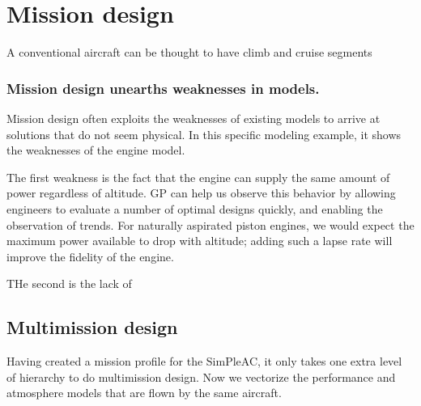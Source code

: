 \chapter{Mission design}

A conventional aircraft can be thought to have climb and cruise segments

\subsection{Mission design unearths weaknesses in models.}

Mission design often exploits the weaknesses of existing models to arrive at solutions
that do not seem physical. In this
specific modeling example, it shows the weaknesses of the engine model.


The first weakness is the fact that the engine can supply the same amount of power
regardless of altitude. \gls{GP} can help us observe this behavior by allowing engineers to
evaluate a number of optimal designs quickly, and enabling the observation of trends.
For naturally aspirated piston engines, we would expect the maximum power available to
drop with altitude; adding such a lapse rate will improve the fidelity of the engine.

THe second is the lack of

\section{Multimission design}

Having created a mission profile for the SimPleAC, it only takes one extra level of
hierarchy to do multimission design. Now we vectorize the performance
and atmosphere models that are flown by the same aircraft.
